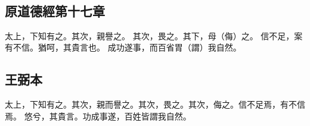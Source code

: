 ﻿%
%

\chapter{~}

\section{原道德經第十七章}

\begin{withgezhu}

\zhsong


太上，下知有\colorbox{missing-color}{之。其次}，親譽之。
其次，畏之。其下，母（\textcolor{tongjia-color}{侮}）之。
信不足，案有不信。猶呵，其貴言也。
成功遂事，而百省胃（\textcolor{tongjia-color}{謂}）我自然。

\end{withgezhu}

\section{王弼本}

\begin{withgezhu}

\zhsong

太上，下知有之。其次，親而譽之。其次，畏之。其次，侮之。信不足焉，有不信焉。
悠兮，其貴言。功成事遂，百姓皆謂我自然。

\end{withgezhu}
